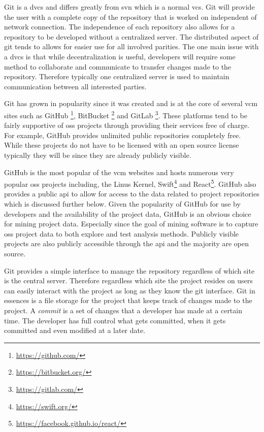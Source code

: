 Git is a \gls{dvcs} and differs greatly from \gls{svn} which is a normal \gls{vcs}. Git will provide the user with a complete copy of the repository that is worked on independent of network connection. The independence of each repository also allows for a repository to be developed without a centralized server. The distributed aspect of git tends to allows for easier use for all involved parities. The one main issue with a \gls{dvcs} is that while decentralization is useful, developers will require some method to collaborate and communicate to transfer changes made to the repository. Therefore typically one centralized server is used to maintain communication between all interested parties.

Git has grown in popularity since it was created and is at the core of several \gls{vcm} sites such as GitHub \footnote{\url{https://github.com/}}, BitBucket \footnote{\url{https://bitbucket.org/}} and GitLab \footnote{\url{https://gitlab.com/}}. These platforms tend to be fairly supportive of \gls{oss} projects through providing their services free of charge. For example, GitHub provides unlimited public repositories completely free. While these projects do not have to be licensed with an open source license typically they will be since they are already publicly visible.


GitHub is the most popular of the \gls{vcm} websites and hosts numerous very popular \gls{oss} projects including, the Linus Kernel, Swift\footnote{\url{https://swift.org/}} and React\footnote{\url{https://facebook.github.io/react/}}. GitHub also provides a public \gls{api} to allow for access to the data related to project repositories which is discussed further below. %
Given the popularity of GitHub for use by developers and the availability of the project data, GitHub is an obvious choice for mining project data. Especially since the goal of mining software is to capture \gls{oss} project data to both explore and test analysis methods. Publicly visible projects are also publicly accessible through the \gls{api} and the majority are open source.


Git provides a simple interface to manage the repository regardless of which site is the central server. Therefore regardless which site the project resides on users can easily interact with the project as long as they know the git interface. Git in essences is a file storage for the project that keeps track of changes made to the project. A \textit{commit} is a set of changes that a developer has made at a certain time. The developer has full control what gets committed, when it gets committed and even modified at a later date.

